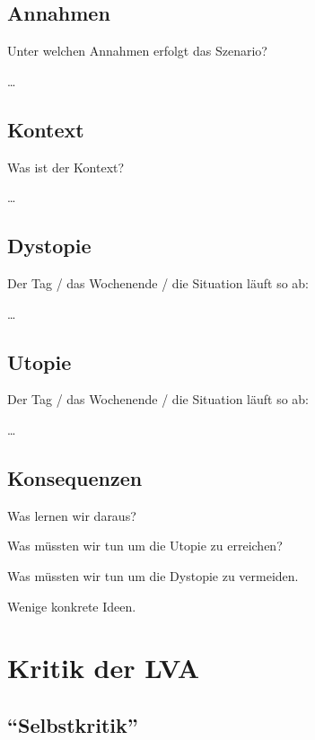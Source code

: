 \documentclass[twoside, a4paper, DIV=11, open=any, bibliography=totoc]{scrbook}
\begin{document}
\section{Annahmen} \label{sec:szenannahmen}

Unter welchen Annahmen erfolgt das Szenario?

\ldots

\section{Kontext} \label{sec:szenkontext}

Was ist der Kontext?

\ldots

\section{Dystopie} \label{sec:szendystopie}

Der Tag / das Wochenende / die Situation läuft so ab:

\ldots

\section{Utopie} \label{sec:szenutopie}

Der Tag / das Wochenende / die Situation läuft so ab:

\ldots

\section{Konsequenzen} \label{sec:szenkonsequenzen}

Was lernen wir daraus?

Was müssten wir tun um die Utopie zu erreichen?

Was müssten wir tun um die Dystopie zu vermeiden.

Wenige konkrete Ideen.



\chapter{Kritik der LVA} \label{chap:lvakritik}

\section{"`Selbstkritik"'}
\end{document}
